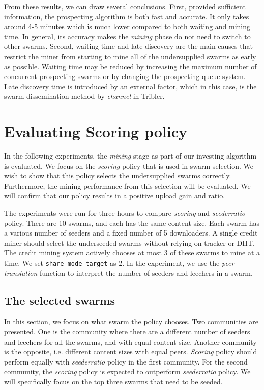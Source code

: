 From these results, we can draw several conclusions. First, provided sufficient information, the prospecting algorithm is both fast and accurate. It only takes around 4-5 minutes which is much lower compared to both waiting and mining time. In general, its accuracy makes the \textit{mining} phase do not need to switch to other swarms. Second, waiting time and late discovery are the main causes that restrict the miner from starting to mine all of the undersupplied swarms as early as possible. Waiting time may be reduced by increasing the maximum number of concurrent prospecting swarms or by changing the prospecting queue system. Late discovery time is introduced by an external factor, which in this case, is the swarm dissemination method by \textit{channel} in Tribler. 

\section{Evaluating Scoring policy}
\label{section:evalscoring}
In the following experiments, the \textit{mining} stage as part of our investing algorithm is evaluated. We focus on the \textit{scoring} policy that is used in swarm selection. We wish to show that this policy selects the undersupplied swarms correctly. Furthermore, the mining performance from this selection will be evaluated. We will confirm that our policy results in a positive upload gain and ratio. 

The experiments were run for three hours to compare \textit{scoring} and \textit{seederratio} policy. There are 10 swarms, and each has the same content size. Each swarm has a various number of seeders and a fixed number of 5 downloaders. A single credit miner should select the underseeded swarms without relying on tracker or DHT. The credit mining system actively chooses at most 3 of these swarms to mine at a time. We set \texttt{share\_mode\_target} as 2. In the experiment, we use the \textit{peer translation} function to interpret the number of seeders and leechers in a swarm. 

\subsection{The selected swarms}
In this section, we focus on what swarm the policy chooses. Two communities are presented. One is the community where there are a different number of seeders and leechers for all the swarms, and with equal content size. Another community is the opposite, i.e. different content sizes with equal peers. \textit{Scoring} policy should perform equally with \textit{seederratio} policy in the first community. For the second community, the \textit{scoring} policy is expected to outperform \textit{seederratio} policy. We will specifically focus on the top three swarms that need to be seeded.

